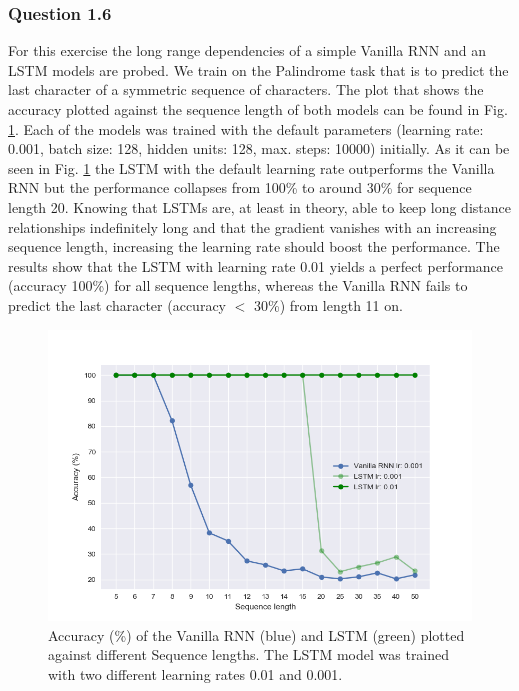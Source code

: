 \documentclass{article}
\begin{document}
\subsubsection*{Question 1.6}
For this exercise the long range dependencies of a simple Vanilla RNN and an LSTM models are probed.  We train on the Palindrome task that is to predict the last character of a symmetric sequence of characters.
The plot that shows the accuracy plotted against the sequence length of both models can be found in Fig. \ref{rnn_lstm_comparison}. Each of the models was trained with the default parameters (learning rate: 0.001, batch size: 128, hidden units: 128, max. steps: 10000) initially. As it can be seen in Fig. \ref{rnn_lstm_comparison} the LSTM with the default learning rate outperforms the Vanilla RNN but the performance collapses from 100\% to around 30\% for sequence length 20. Knowing that LSTMs are, at least in theory, able to keep long distance relationships indefinitely long and that the gradient vanishes with an increasing sequence length, increasing the learning rate should boost the performance. The results show that the LSTM with learning rate 0.01 yields a perfect performance (accuracy 100\%) for all sequence lengths, whereas the Vanilla RNN fails to predict the last character (accuracy $<$ 30\%) from length 11 on.
\begin{figure}[h!]
    \centering
  \centering
  \includegraphics[scale=0.45]{Figure_1}
  \caption{Accuracy (\%) of the Vanilla RNN (blue) and LSTM (green) plotted against different Sequence lengths. The LSTM model was trained with two different learning rates 0.01 and 0.001. }
  \label{rnn_lstm_comparison}
\end{figure}
\end{document}
